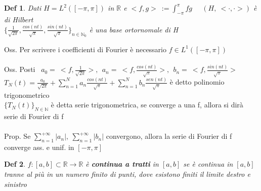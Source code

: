 \documentclass{article}
\theoremstyle{unnumbered}
\newtheorem* {theoremT}{Def}
\theoremstyle{unnumbered1}
\newenvironment{defi}{\begin{gBox}\begin{theoremT}}{\end{theoremT}\end{gBox}}
\begin{document}
\begin{defi}
Dati $H=L^2([-\pi,\pi])$ in $\mathbb{R}$ e $<f,g>\ :=\int_{-\pi}^{\pi}fg$ \ \ $(H,\ <\cdot,\cdot>)$ è di Hilbert \\ $\{\frac{1}{\sqrt{2\pi}},\frac{cos(nt)}{\sqrt{\pi}},\frac{sin(nt)}{\sqrt{\pi}}\}_{n\in\mathbb{N}_0}$ è una base ortornomale di H
\end{defi}
%
Oss. Per scrivere i coefficienti di Fourier è necessario $f\in L^1([-\pi,\pi])$ \\ \\
%
Oss. Posti \ $a_0=\ <f,\frac{1}{\sqrt{2\pi}}>,\ \ a_n=\ <f,\frac{cos(nt)}{\sqrt{\pi}}>,\ \ b_n=\ <f, \frac{sin(nt)}{\sqrt{\pi}}>$\\
$T_N(t)= \frac{a_0}{\sqrt{2\pi}}+\sum_{n=1}^N a_n\frac{cos(nt)}{\sqrt{\pi}} +\sum_{n=1}^N b_n\frac{sen(nt)}{\sqrt{\pi}}$ è detto polinomio trigonometrico\\
$\{T_N(t)\}_{N\in\mathbb{N}}$ è detta serie trigonometrica, se converge a una f, allora si dirà serie di  Fourier di f\\ \\
%
%
Prop. Se $\sum_{n=1}^{+\infty}|a_n|, \ \sum_{n=1}^{+\infty}|b_n|$ convergono, allora la serie di Fourier di f  converge ass. e unif. in $[-\pi,\pi]$\\ 

\begin{defi}
$f:[a,b]\subset\mathbb{R}\to\mathbb{R}$ è \textbf{continua a tratti} in $[a,b]$ se è continua in $[a,b]$ tranne al più in un numero finito di punti, dove esistono finiti il limite destro e sinistro
\end{defi}
\end{document}
